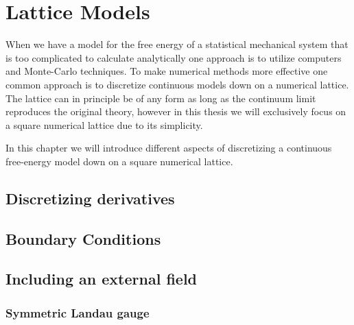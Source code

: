 \chapter{Lattice Models}

When we have a model for the free energy of a statistical mechanical system that is too complicated to
calculate analytically one approach is to utilize computers and Monte-Carlo techniques. To make numerical
methods more effective one common approach is to discretize continuous models down on a 
numerical lattice. The lattice can in principle be of any form as long as the continuum limit reproduces
the original theory, however in this thesis we will exclusively focus on a square numerical lattice
due to its simplicity.

In this chapter we will introduce different aspects of discretizing a continuous free-energy model down
on a square numerical lattice.

\section{Discretizing derivatives}


\section{Boundary Conditions}

\section{Including an external field}

\subsection{Symmetric Landau gauge}
